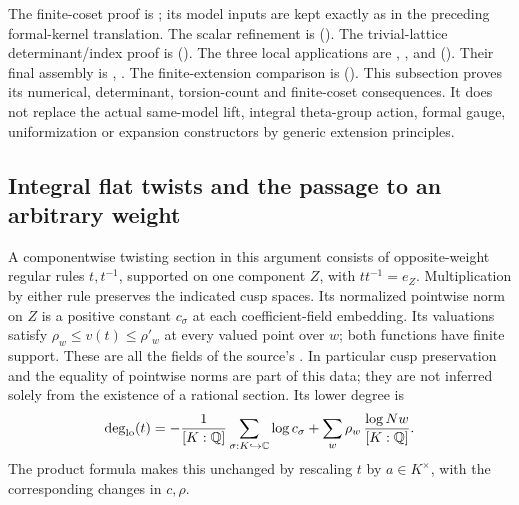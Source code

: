 The finite-coset proof is ;
its model inputs are kept exactly as in the preceding formal-kernel
translation.  The scalar refinement is
().
The trivial-lattice determinant/index proof is
().
The three local applications are
,
, and
().
Their final assembly is
,
.
The finite-extension comparison is
().
This subsection proves its numerical, determinant, torsion-count
and finite-coset consequences.  It does not replace the actual
same-model lift, integral theta-group action, formal gauge,
uniformization or expansion constructors by generic extension
principles.


\subsection{Integral flat twists and the passage to an arbitrary weight}
\label{subsec:ftb-flat-twists-weight-reduction}

A componentwise twisting section in this argument consists of
opposite-weight regular rules \(t,t^{-1}\), supported on one
component \(Z\), with \(tt^{-1}=e_Z\).
Multiplication by either rule preserves the indicated cusp spaces.
Its normalized pointwise norm on \(Z\) is a positive constant
\(c_\sigma\) at each coefficient-field embedding.
Its valuations satisfy
\(\rho_w\le v(t)\le\rho'_w\) at every valued point over \(w\);
both functions have finite support.
These are all the fields of the source's .
In particular cusp preservation and the equality of pointwise
norms are part of this data; they are not inferred solely from the
existence of a rational section.
Its lower degree is
\[
 \deg_{\rm lo}(t)=
   -\frac1{[K:\mathbb Q]}\sum_{\sigma:K\hookrightarrow\mathbb C}
                           \log c_\sigma
   +\sum_w\rho_w\,\frac{\log Nw}{[K:\mathbb Q]} .
\]
The product formula makes this unchanged by rescaling \(t\) by
\(a\in K^\times\), with the corresponding changes in \(c,\rho\).

